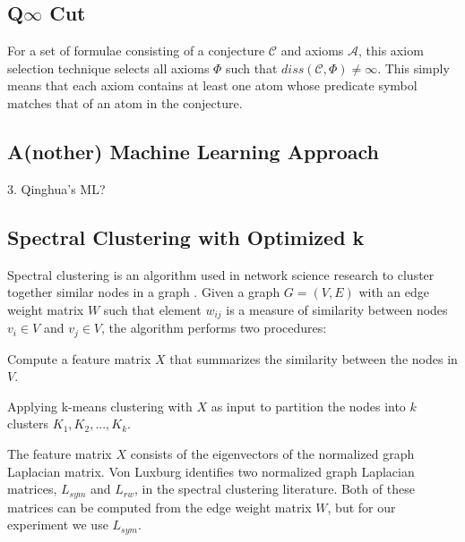 \documentclass[EPiC]{easychair}
\newenvironment{packed_enumerate}{
\vspace*{-0.5em}
\begin{enumerate}
  \setlength{\partopsep}{0pt}
  \setlength{\itemsep}{1pt}
  \setlength{\parskip}{0pt}
  \setlength{\parsep}{0pt}
}{\end{enumerate}}
\begin{document}
\subsection{Q$\infty$ Cut}
\label{QinghuaInf}

For a set of formulae consisting of a conjecture $\mathcal{C}$ and axioms 
$\mathcal{A}$, this axiom selection technique selects all axioms $\Phi$
such that $diss(\mathcal{C},\Phi) \neq \infty$.
This simply means that each axiom contains at least one atom whose predicate
symbol matches that of an atom in the conjecture.

\subsection{A(nother) Machine Learning Approach}
\label{QinghuaML}

3. Qinghua's ML?
\subsection{Spectral Clustering with Optimized k}
\label{Zishi}

Spectral clustering is an algorithm used in network science research to
cluster together similar nodes in a graph \cite{vLu07}. 
Given a graph $G = (V, E)$ with an edge weight matrix $W$ such that element
$w_{ij}$ is a measure of similarity between nodes $v_{i} \in V$ and 
$v_{j} \in V$, the algorithm performs two procedures:
\begin{packed_enumerate}
\item Compute a feature matrix $X$ that summarizes the similarity between 
      the nodes in $V$.
\item Applying k-means clustering \cite{} with $X$ as input to partition the 
      nodes into $k$ clusters $K_{1}, K_{2}, ..., K_{k}$.
\end{packed_enumerate}

The feature matrix $X$ consists of the eigenvectors of the normalized 
graph Laplacian matrix. Von Luxburg \cite{vLu07} identifies two normalized 
graph Laplacian matrices, $L_{sym}$ and $L_{rw}$, in the spectral clustering 
literature. Both of these matrices can be computed from the edge weight matrix 
$W$, but for our experiment we use $L_{sym}$.
\end{document}
